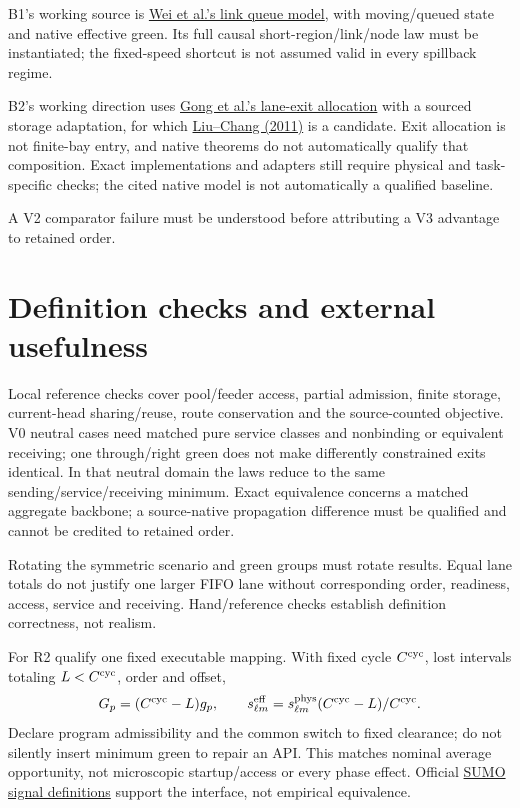 \documentclass[10pt,a4paper]{article}
\begin{document}
B1's working source is
\href{https://arxiv.org/html/2310.12249v2}{Wei et al.'s link queue model},
with moving/queued state and native effective green. Its full causal
short-region/link/node law must be instantiated; the fixed-speed shortcut
is not assumed valid in every spillback regime.

B2's working direction uses
\href{https://www.sciencedirect.com/science/article/pii/S0191261525000578}
{Gong et al.'s lane-exit allocation} with a sourced storage adaptation,
for which \href{https://attap.umd.edu/wp-content/uploads/2022/05/TRC522.pdf}
{Liu--Chang (2011)} is a candidate. Exit allocation is not finite-bay
entry, and native theorems do not automatically qualify that composition.
Exact implementations and adapters still require physical and task-specific
checks; the cited native model is not automatically a qualified baseline.

A V2 comparator failure must be understood before attributing a V3
advantage to retained order.

\section{Definition checks and external usefulness}

Local reference checks cover pool/feeder access, partial admission,
finite storage, current-head
sharing/reuse, route conservation and the source-counted objective.
V0 neutral cases need matched pure service classes and nonbinding or
equivalent receiving; one through/right green does not make differently
constrained exits identical. In that neutral domain the laws reduce to
the same sending/service/receiving minimum. Exact equivalence concerns
a matched aggregate backbone; a source-native propagation difference
must be qualified and cannot be credited to retained order.

Rotating the symmetric scenario and green groups must rotate results.
Equal lane totals do not justify one larger FIFO lane without
corresponding order, readiness, access, service and receiving.
Hand/reference checks establish definition correctness, not realism.

For R2 qualify one fixed executable mapping. With fixed cycle
$C^{\rm cyc}$, lost intervals totaling $L<C^{\rm cyc}$, order and offset,
\begin{equation}
 G_p=(C^{\rm cyc}-L)g_p,\qquad
 s^{\rm eff}_{\ell m}=s^{\rm phys}_{\ell m}
                         (C^{\rm cyc}-L)/C^{\rm cyc}.
 \label{eq:reference-action}
\end{equation}
Declare program admissibility and the common switch to fixed clearance;
do not silently insert minimum green to repair an API.
This matches nominal average opportunity, not microscopic startup/access
or every phase effect. Official
\href{https://sumo.dlr.de/docs/Simulation/Traffic_Lights.html}
{SUMO signal definitions} support the interface, not empirical equivalence.
\end{document}
